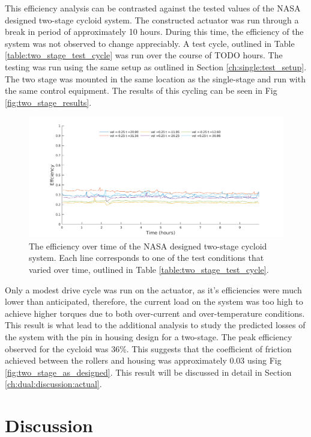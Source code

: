 This efficiency analysis can be contrasted against the tested values of the NASA designed two-stage cycloid system. The constructed actuator was run through a break in period of approximately 10 hours. During this time, the efficiency of the system was not observed to change appreciably. A test cycle, outlined in Table \ref{table:two_stage_test_cycle} was run over the course of TODO hours. The testing was run using the same setup as outlined in Section \ref{ch:single:test_setup}. The two stage was mounted in the same location as the single-stage and run with the same control equipment. The results of this cycling can be seen in Fig \ref{fig:two_stage_results}.

\begin{figure}[h]
	\centering
	\includegraphics[width=0.75\linewidth]{fig/two_stage_eff}
   \caption{The efficiency over time of the NASA designed two-stage cycloid system. Each line corresponds to one of the test conditions that varied over time, outlined in Table \ref{table:two_stage_test_cycle}.}
   \label{fig:two_stage_eff}
\end{figure}

Only a modest drive cycle was run on the actuator, as it's efficiencies were much lower than anticipated, therefore, the current load on the system was too high to achieve higher torques due to both over-current and over-temperature conditions. This result is what lead to the additional analysis to study the predicted losses of the system with the pin in housing design for a two-stage. The peak efficiency observed for the cycloid was 36\%. This suggests that the coefficient of friction achieved between the rollers and housing was approximately 0.03 using Fig \ref{fig:two_stage_as_designed}. This result will be discussed in detail in Section \ref{ch:dual:discussion:actual}.


\section{Discussion} \label{ch:dual:discussion}

